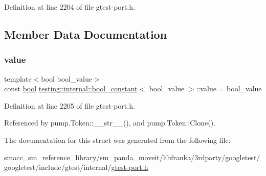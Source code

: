 Definition at line 2204 of file gtest-\/port.\+h.



\subsection{Member Data Documentation}
\mbox{\label{structtesting_1_1internal_1_1bool__constant_a499fba6576296b04d99690a486424b32}} 
\subsubsection{\texorpdfstring{value}{value}}
{\footnotesize\ttfamily template$<$bool bool\+\_\+value$>$ \\
const \hyperlink{classbool}{bool} \hyperlink{structtesting_1_1internal_1_1bool__constant}{testing\+::internal\+::bool\+\_\+constant}$<$ bool\+\_\+value $>$\+::value = bool\+\_\+value\hspace{0.3cm}{\ttfamily [static]}}



Definition at line 2205 of file gtest-\/port.\+h.



Referenced by pump.\+Token\+::\+\_\+\+\_\+str\+\_\+\+\_\+(), and pump.\+Token\+::\+Clone().



The documentation for this struct was generated from the following file\+:\begin{DoxyCompactItemize}
\item 
smacc\+\_\+sm\+\_\+reference\+\_\+library/sm\+\_\+panda\+\_\+moveit/libfranka/3rdparty/googletest/googletest/include/gtest/internal/\hyperlink{gtest-port_8h}{gtest-\/port.\+h}\end{DoxyCompactItemize}
